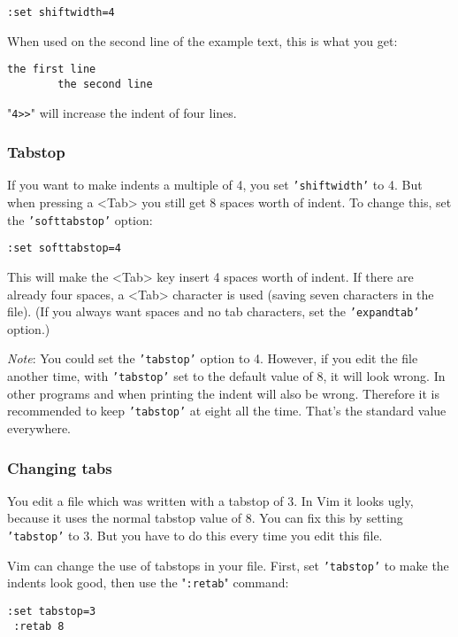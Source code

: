\begin{Verbatim}[samepage=true]
 :set shiftwidth=4
\end{Verbatim}

When used on the second line of the example text, this is what you get:

\begin{Verbatim}[samepage=true]
    the first line 
        the second line 
\end{Verbatim}

"\texttt{4>>}" will increase the indent of four lines.
\subsubsection{Tabstop}
If you want to make indents a multiple of 4, you set \texttt{'shiftwidth'} to 4.
But when pressing a <Tab> you still get 8 spaces worth of indent.
To change this, set the \texttt{'softtabstop'} option:

\begin{Verbatim}[samepage=true]
 :set softtabstop=4
\end{Verbatim}

This will make the <Tab> key insert 4 spaces worth of indent.
If there are already four spaces, a <Tab> character is used (saving seven characters in the file).
(If you always want spaces and no tab characters, set the \texttt{'expandtab'} option.)

\emph{Note}: You could set the \texttt{'tabstop'} option to 4.
However, if you edit the file another time, with \texttt{'tabstop'} set to the default value of 8, it will look wrong.
In other programs and when printing the indent will also be wrong.
Therefore it is recommended to keep \texttt{'tabstop'} at eight all the time.
That's the standard value everywhere.

\subsubsection{Changing tabs}
You edit a file which was written with a tabstop of 3.
In Vim it looks ugly, because it uses the normal tabstop value of 8.
You can fix this by setting \texttt{'tabstop'} to 3.
But you have to do this every time you edit this file.

Vim can change the use of tabstops in your file.
First, set \texttt{'tabstop'} to make the indents look good, then use the "\texttt{:retab}" command:

\begin{Verbatim}[samepage=true]
 :set tabstop=3
 :retab 8
\end{Verbatim}

